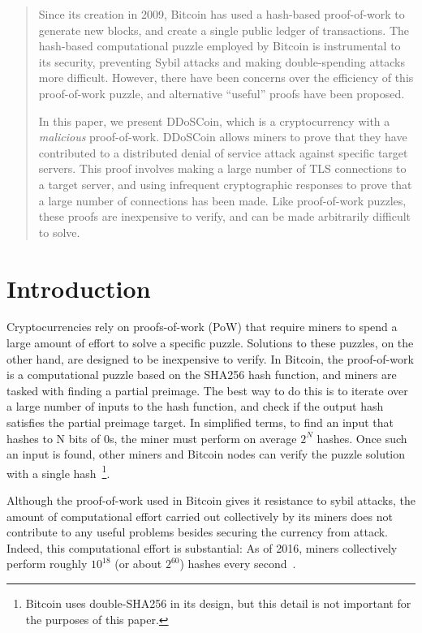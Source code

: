 



\begin{abstract}

Since its creation in 2009, Bitcoin has used a hash-based proof-of-work to
generate new blocks, and create a single public ledger of transactions. The
hash-based computational puzzle employed by Bitcoin is instrumental to its
security, preventing Sybil attacks and making double-spending attacks more
difficult. However, there have been concerns over the efficiency of this
proof-of-work puzzle, and alternative ``useful'' proofs have been proposed.

In this paper, we present DDoSCoin, which is a cryptocurrency with a
\emph{malicious} proof-of-work. DDoSCoin allows miners to prove that they have
contributed to a distributed denial of service attack against specific target
servers.  This proof involves making a large number of TLS connections to a
target server, and using infrequent cryptographic responses to prove that a
large number of connections has been made. Like proof-of-work puzzles, these
proofs are inexpensive to verify, and can be made arbitrarily difficult to
solve.

\end{abstract}




\section{Introduction}


Cryptocurrencies rely on proofs-of-work (PoW) that require miners to spend a
large amount of effort to solve a specific puzzle.  Solutions to these puzzles,
on the other hand, are designed to be inexpensive to verify. In Bitcoin, the
proof-of-work is a computational puzzle based on the SHA256 hash function, and
miners are tasked with finding a partial preimage. The best way to do this is to
iterate over a large number of inputs to the hash function, and check if the
output hash satisfies the partial preimage target. In simplified terms, to find
an input that hashes to N bits of 0s, the miner must perform on average $2^{N}$
hashes. Once such an input is found, other miners and Bitcoin nodes can verify the
puzzle solution with a single hash~\footnote{Bitcoin uses double-SHA256 in its
design, but this detail is not important for the purposes of this paper.}.


Although the proof-of-work used in Bitcoin gives it resistance to sybil attacks,
the amount of computational effort carried out collectively by its miners does
not contribute to any useful problems besides securing the currency from attack.
Indeed, this computational effort is substantial: As of 2016, miners
collectively perform roughly $10^{18}$ (or about $2^{60}$) hashes every
second~\cite{blockchain-hashrate}.

